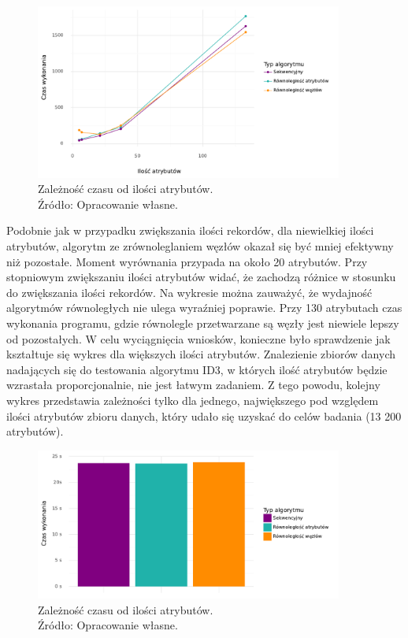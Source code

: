 \documentclass[12pt]{article}
\begin{document}
\begin{figure}[H]
    \centering
	\includegraphics[width=0.9\textwidth]{analysis-attributes.pdf}
    \caption{Zależność czasu od ilości atrybutów.\\Źródło: Opracowanie własne.}
    \label{fig:analysis-attributes}
\end{figure}

Podobnie jak w przypadku zwiększania ilości rekordów, dla niewielkiej ilości atrybutów, algorytm ze
zrównoleglaniem węzłów okazał się być mniej efektywny niż pozostałe. Moment wyrównania
przypada na około 20 atrybutów. Przy stopniowym zwiększaniu ilości atrybutów widać, że
zachodzą różnice w stosunku do zwiększania ilości rekordów.
Na wykresie można zauważyć, że wydajność algorytmów równoległych
nie ulega wyraźniej poprawie. Przy 130 atrybutach czas wykonania programu, gdzie równolegle przetwarzane są węzły
jest niewiele lepszy od pozostałych. W celu wyciągnięcia wniosków, konieczne było sprawdzenie jak kształtuje się
wykres dla większych ilości atrybutów. Znalezienie zbiorów danych nadających się do testowania algorytmu ID3, w których ilość
atrybutów będzie wzrastała proporcjonalnie, nie jest łatwym zadaniem. Z tego powodu, kolejny wykres przedstawia zależności tylko dla
jednego, największego pod względem ilości atrybutów zbioru danych, który udało się uzyskać do celów badania (13 200 atrybutów).

\begin{figure}[H]
    \centering
	\includegraphics[width=0.9\textwidth]{analysis-attributes-bar-plot.pdf}
    \caption{Zależność czasu od ilości atrybutów.\\Źródło: Opracowanie własne.}
    \label{fig:analysis-attributes-bar-plot}
\end{figure}
\end{document}
